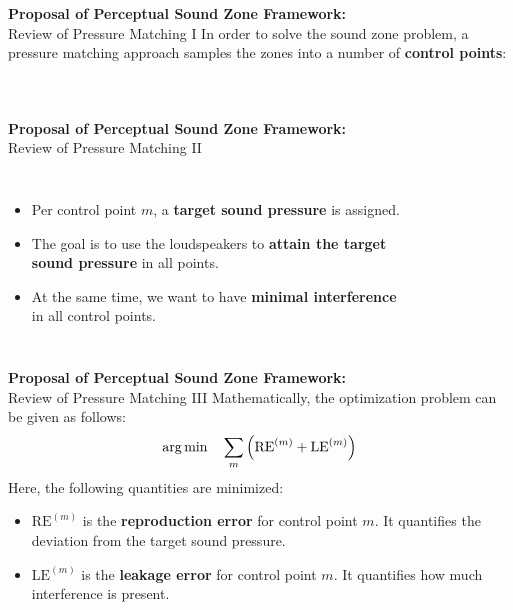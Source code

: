 \documentclass[aspectratio=169]{beamer}
\begin{document}
\begin{frame}{\textbf{Proposal of Perceptual Sound Zone Framework:}\\ Review of Pressure Matching I}
    In order to solve the sound zone problem, a pressure matching approach samples the zones into a number of \textbf{control points}:
    \begin{columns}[c]
        \begin{figure}[]
            \centering
            \scalebox{0.7}{}
        \end{figure}
        \begin{figure}[]
            \centering
            \scalebox{0.7}{}
        \end{figure}
    \end{columns}
\end{frame}

\begin{frame}{\textbf{Proposal of Perceptual Sound Zone Framework:}\\ Review of Pressure Matching II}
    \begin{columns}[c]
        \begin{itemize}
            \item Per control point $m$, a \textbf{target sound pressure} is assigned.
            \item The goal is to use the loudspeakers to \textbf{attain the target sound pressure} in all points.
            \item At the same time, we want to have \textbf{minimal interference} in all control points.
        \end{itemize}
        \begin{figure}[]
            \centering
            \scalebox{0.7}{}
        \end{figure}
    \end{columns}
\end{frame}

\begin{frame}{\textbf{Proposal of Perceptual Sound Zone Framework:}\\ Review of Pressure Matching III}
    Mathematically, the optimization problem can be given as follows:
    \begin{equation}
        \operatorname*{arg\,min}_{}\quad \sum_m \left(\mathrm{RE}^{(m)} + \mathrm{LE}^{(m)}\right)
    \end{equation}
    Here, the following quantities are minimized:
    \begin{itemize}
        \item $\mathrm{RE}^{(m)}$ is the \textbf{reproduction error} for control point $m$. 
            It quantifies the deviation from the target sound pressure.     
        \item $\mathrm{LE}^{(m)}$ is the \textbf{leakage error} for control point $m$. 
            It quantifies how much interference is present. 
    \end{itemize}
\end{frame}
\end{document}
